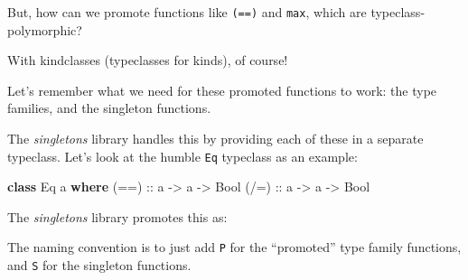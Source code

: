 \documentclass[]{article}
\newenvironment{Shaded}{}{}
\newcommand{\CommentTok}[1]{\textcolor[rgb]{0.38,0.63,0.69}{\textit{#1}}}
\newcommand{\DataTypeTok}[1]{\textcolor[rgb]{0.56,0.13,0.00}{#1}}
\newcommand{\FunctionTok}[1]{\textcolor[rgb]{0.02,0.16,0.49}{#1}}
\newcommand{\KeywordTok}[1]{\textcolor[rgb]{0.00,0.44,0.13}{\textbf{#1}}}
\newcommand{\NormalTok}[1]{#1}
\newcommand{\OtherTok}[1]{\textcolor[rgb]{0.00,0.44,0.13}{#1}}
\begin{document}
But, how can we promote functions like \texttt{(==)} and \texttt{max}, which are
typeclass-polymorphic?

With kindclasses (typeclasses for kinds), of course!

Let's remember what we need for these promoted functions to work: the type
families, and the singleton functions.

The \emph{singletons} library handles this by providing each of these in a
separate typeclass. Let's look at the humble \texttt{Eq} typeclass as an
example:

\begin{Shaded}
\begin{Highlighting}[]
\KeywordTok{class} \DataTypeTok{Eq}\NormalTok{ a }\KeywordTok{where}
\OtherTok{    (==) ::}\NormalTok{ a }\OtherTok{->}\NormalTok{ a }\OtherTok{->} \DataTypeTok{Bool}
\OtherTok{    (/=) ::}\NormalTok{ a }\OtherTok{->}\NormalTok{ a }\OtherTok{->} \DataTypeTok{Bool}
\end{Highlighting}
\end{Shaded}

The \emph{singletons} library promotes this as:

\begin{Shaded}
\end{Shaded}

The naming convention is to just add \texttt{P} for the ``promoted'' type family
functions, and \texttt{S} for the singleton functions.
\end{document}
